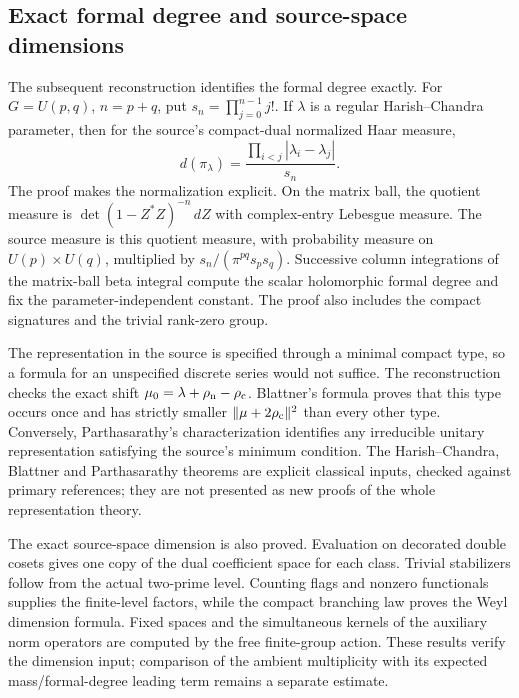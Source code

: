 \documentclass[11pt,a4paper]{article}
\theoremstyle{remark}
\begin{document}
\subsection{Exact formal degree and source-space dimensions}

The subsequent reconstruction identifies the formal degree exactly.
For $G=U(p,q)$, $n=p+q$, put $s_n=\prod_{j=0}^{n-1}j!$.
If $\lambda$ is a regular Harish--Chandra parameter, then for
the source's compact-dual normalized Haar measure,
\[
                 d(\pi_\lambda)
                   =\frac{\prod_{i<j}|\lambda_i-\lambda_j|}{s_n}.
\]
The proof makes the normalization explicit. On the matrix ball,
the quotient measure is
$\det(1-Z^*Z)^{-n}\,dZ$ with complex-entry Lebesgue measure.
The source measure is this quotient measure, with probability
measure on $U(p)\times U(q)$, multiplied by
$s_n/(\pi^{pq}s_ps_q)$. Successive column integrations of the
matrix-ball beta integral compute the scalar holomorphic
formal degree and fix the parameter-independent constant.
The proof also includes the compact signatures and the trivial
rank-zero group.

The representation in the source is specified through a minimal
compact type, so a formula for an unspecified discrete series
would not suffice. The reconstruction checks the exact shift
$\mu_0=\lambda+\rho_{\rm n}-\rho_{\rm c}$.
Blattner's formula proves that this type occurs once and has
strictly smaller $\|\mu+2\rho_{\rm c}\|^2$ than every other type.
Conversely, Parthasarathy's characterization identifies any
irreducible unitary representation satisfying the source's
minimum condition. The Harish--Chandra, Blattner and
Parthasarathy theorems are explicit classical inputs, checked
against primary references; they are not presented as new
proofs of the whole representation theory.
\cite{harish-chandra-ds-ii,duflo-heckman-vergne,baldoni-vergne,parthasarathy-minimal}

The exact source-space dimension is also proved. Evaluation on
decorated double cosets gives one copy of the dual coefficient
space for each class. Trivial stabilizers follow from the actual
two-prime level. Counting flags and nonzero functionals supplies
the finite-level factors, while the compact branching law proves
the Weyl dimension formula. Fixed spaces and the simultaneous
kernels of the auxiliary norm operators are computed by the
free finite-group action. These results verify the dimension
input; comparison of the ambient multiplicity with its expected
mass/formal-degree leading term remains a separate estimate.
\end{document}
